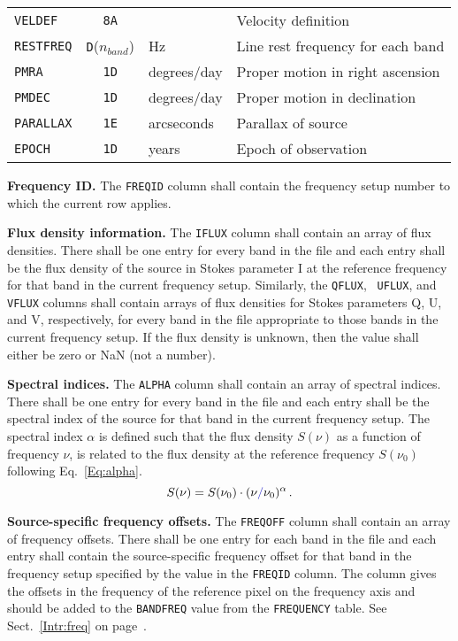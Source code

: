 \documentclass[twoside]{article}
\newcommand{\Hi}[1]{\textcolor{hicol}{#1}}
\newcommand{\Me}[1]{\textcolor{mecol}{#1}}
\newcommand{\nband}{$n_{band}$}
\begin{document}
\begin{center}
\begin{tabular}{lcll}
{\tt VELDEF}     & {\tt 8A} &           & Velocity definition \\
{\tt RESTFREQ}   & {\tt D}(\nband) & Hz & Line rest frequency for each
                                        band \\
{\tt PMRA}       & {\tt 1D} & degrees/day & Proper motion in right
                                        ascension \\
{\tt PMDEC}      & {\tt 1D} & degrees/day & Proper motion in
                                        declination \\
{\tt PARALLAX}   & {\tt 1E} & arcseconds  & Parallax of source \\
\hline
\Me{{\tt EPOCH}} & \Me{{\tt 1D}} & \Me{years} & \Me{Epoch of
                                               observation}
\end{tabular}
\end{center}

{\bf Frequency ID\@.}  The {\tt FREQID} column shall contain the
frequency setup number to which the current row applies.

{\bf Flux density information.}  The {\tt IFLUX} column shall contain
an array of flux densities.  There shall be one entry for every band
in the file and each entry shall be the flux density of the source in
Stokes \Hi{parameter} I at the reference frequency for that band in
the current frequency setup.  \Hi{Similarly, the {\tt QFLUX}, {\tt
UFLUX}, and {\tt VFLUX} columns shall contain arrays of flux densities
for Stokes parameters Q, U, and V, respectively, for every band in the
file appropriate to those bands in the current frequency setup.}  If
the flux density is unknown, then the value shall either be zero or
NaN (not a number).

{\bf Spectral indices.}  The {\tt ALPHA} column shall contain an array
of spectral indices.  There shall be one entry for every band in the
file and each entry shall be the spectral index of the source for that
band in the current frequency setup.  The spectral index $\alpha$ is
defined such that the flux density $S(\nu)$ as a function of
frequency $\nu$, is related to the flux density at the reference
frequency $S(\nu_0)$ following Eq.~\ref{Eq:alpha}.
\begin{equation}
S(\nu) = S(\nu_0) \cdot (\nu \Me{/} \nu_0)^\alpha  \label{Eq:alpha} \, .
\end{equation}

{\bf Source-specific frequency offsets.}  The {\tt FREQOFF} column
shall contain an array of frequency offsets.  There shall be one entry
for \Me{each} band in the file and each entry shall contain the
source-specific frequency offset for that band in the \Hi{frequency
setup specified by the value in the {\tt FREQID} column.}  \Me{The
column gives the offsets in the frequency of the reference pixel on
the frequency axis and should be added to the {\tt BANDFREQ} value
from the {\tt FREQUENCY} table.}  See Sect.~\ref{Intr:freq} on
page~\pageref{Intr:freq}.
\end{document}
